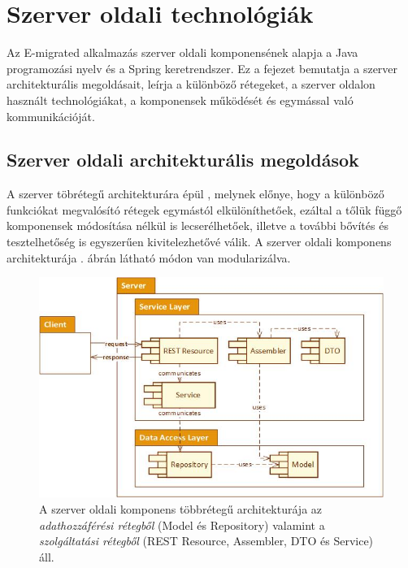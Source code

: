 \chapter{Szerver oldali technológiák}\label{ch:szerver}

\begin{osszefoglal}
Az E-migrated alkalmazás szerver oldali komponensének alapja a Java programozási nyelv és a Spring keretrendszer. Ez a fejezet bemutatja a szerver architekturális megoldásait, leírja a különböző rétegeket, a szerver oldalon használt technológiákat,  a komponensek működését és egymással való kommunikációját. 
\end{osszefoglal}

\section{Szerver oldali architekturális megoldások}
\label{sec:szerverArch}

A szerver töbrétegű architekturára épül \cite{MultitierArchitecture}, melynek előnye, hogy a különböző funkciókat megvalósító rétegek egymástól elkülöníthetőek, ezáltal a tőlük függő komponensek módosítása nélkül is lecserélhetőek, illetve a további bővítés és tesztelhetőség is egyszerűen kivitelezhetővé válik. A szerver oldali komponens architekturája . ábrán látható módon van modularizálva. 
\begin{figure}
  \centering
  \includegraphics[width=0.9\linewidth]{images/ServerArchitecture}
  \caption{A szerver oldali komponens többrétegű architekturája  az \textit{adathozzáférési rétegből} (Model és Repository) valamint a \textit{szolgáltatási rétegből} (REST Resource, Assembler, DTO és Service) áll.}
  \label{fig:ServerArchitecture}
\end{figure}

